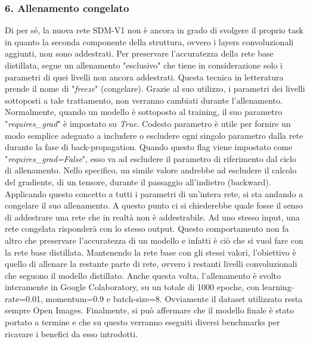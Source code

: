 \subsubsection{6. Allenamento congelato}
Di per sé, la nuova rete SDM-V1 non è ancora in grado di svolgere il proprio task in quanto la seconda componente della struttura, ovvero i layers convoluzionali aggiunti, non sono addestrati. Per preservare l'accuratezza della rete base distillata, segue un allenamento "esclusivo" che tiene in considerazione solo i parametri di quei livelli non ancora addestrati. Questa tecnica in letteratura prende il nome di "\emph{freeze}" (congelare). Grazie al suo utilizzo, i parametri dei livelli sottoposti a tale trattamento, non verranno cambiati durante l'allenamento. Normalmente, quando un modello è sottoposto al training, il suo parametro "\emph{requires\_grad}" è impostato su \emph{True}. Codesto parametro è utile per fornire un modo semplice adeguato a includere o escludere ogni singolo parametro dalla rete durante la fase di back-propagation. Quando questo flag viene impostato come "\emph{requires\_grad=False}", esso va ad escludere il parametro di riferimento dal ciclo di allenamento. Nello specifico, un simile valore andrebbe ad escludere il calcolo del gradiente, di un tensore, durante il passaggio all'indietro (backward). Applicando questo concetto a tutti i parametri di un'intera rete, si sta andando a congelare il suo allenamento. A questo punto ci si chiederebbe quale fosse il senso di addestrare una rete che in realtà non è addestrabile. Ad uno stesso input, una rete congelata risponderà con lo stesso output. Questo comportamento non fa altro che preservare l'accuratezza di un modello e infatti è ciò che si vuol fare con la rete base distillata. Mantenendo la rete base con gli stessi valori, l'obiettivo è quello di allenare la restante parte di rete, ovvero i restanti livelli convoluzionali che seguono il modello distillato. Anche questa volta, l'allenamento è svolto interamente in Google Colaboratory, su un totale di 1000 epoche, con learning-rate=0.01, momentum=0.9 e batch-size=8. Ovviamente il dataset utilizzato resta sempre Open Images. Finalmente, si può affermare che il modello finale è stato portato a termine e che su questo verranno eseguiti diversi benchmarks per ricavare i benefici da esso introdotti.  

